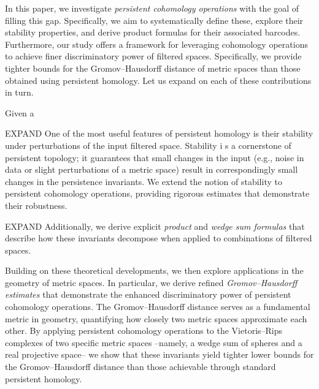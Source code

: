In this paper, we investigate \textit{persistent cohomology operations} with the goal of filling this gap.
Specifically, we aim to systematically define these, explore their stability properties, and derive product formulas for their associated barcodes.
Furthermore, our study offers a framework for leveraging cohomology operations to achieve finer discriminatory power of filtered spaces.
Specifically, we provide tighter bounds for the Gromov--Hausdorff distance of metric spaces than those obtained using persistent homology.
Let us expand on each of these contributions in turn.

Given a

EXPAND One of the most useful features of persistent homology is their stability under perturbations of the input filtered space.
Stability i	s a cornerstone of persistent topology; it guarantees that small changes in the input (e.g., noise in data or slight perturbations of a metric space) result in correspondingly small changes in the persistence invariants.
We extend the notion of stability to persistent cohomology operations, providing rigorous estimates that demonstrate their robustness.

EXPAND Additionally, we derive explicit \textit{product} and \textit{wedge sum formulas} that describe how these invariants decompose when applied to combinations of filtered spaces.


Building on these theoretical developments, we then explore applications in the geometry of metric spaces.
In particular, we derive refined \textit{Gromov--Hausdorff estimates} that demonstrate the enhanced discriminatory power of persistent cohomology operations.
The Gromov--Hausdorff distance serves as a fundamental metric in geometry, quantifying how closely two metric spaces approximate each other.
By applying persistent cohomology operations to the Vietoris--Rips complexes of two specific metric spaces --namely, a wedge sum of spheres and a real projective space-- we show that these invariants yield tighter lower bounds for the Gromov--Hausdorff distance than those achievable through standard persistent homology.

